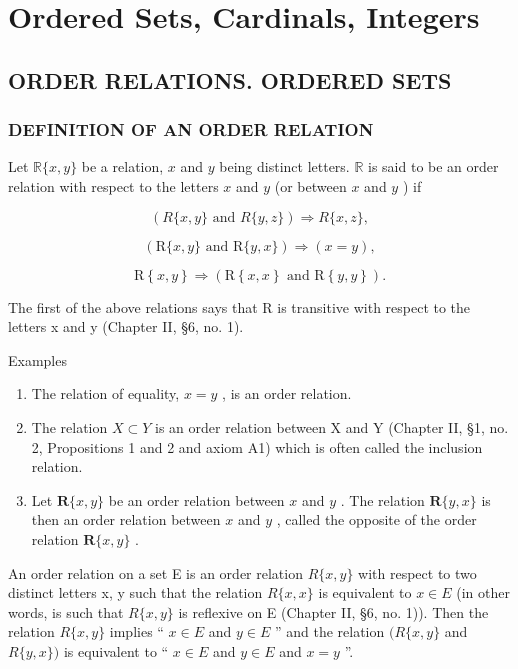 \chapter{Ordered Sets, Cardinals, Integers}

\section{ORDER RELATIONS. ORDERED SETS}

\subsection{DEFINITION OF AN ORDER RELATION}

Let \(\mathbb{R}\{x, y\}\) be a relation, \(x\) and \(y\) being distinct letters. \(\mathbb{R}\) is said to be an order relation with respect to the letters \(x\) and \(y\) (or between \(x\) and \(y\) ) if

\[
(R \{x, y \} \text {   and   } R \{y, z \}) \Longrightarrow R \{x, z \},
\]

\[
(\mathrm{R} \{x, y \} \text {   and   } \mathrm{R} \{y, x \}) \Longrightarrow (x = y),
\]

\[
\mathrm{R} \left\{x, y \right\} \Longrightarrow (\mathrm{R} \left\{x, x \right\} \text { and } \mathrm{R} \left\{y, y \right\}).
\]

The first of the above relations says that R is transitive with respect to the letters x and y (Chapter II, §6, no. 1).

Examples

\begin{enumerate}
\def\labelenumi{(\arabic{enumi})}
\item
  The relation of equality, \(x = y\) , is an order relation.
\item
  The relation \(X \subset Y\) is an order relation between X and Y (Chapter II, §1, no. 2, Propositions 1 and 2 and axiom A1) which is often called the inclusion relation.
\item
  Let \(\mathbf{R}\{x, y\}\) be an order relation between \(x\) and \(y\) . The relation \(\mathbf{R}\{y, x\}\) is then an order relation between \(x\) and \(y\) , called the opposite of the order relation \(\mathbf{R}\{x, y\}\) .
\end{enumerate}

An order relation on a set E is an order relation \(R\{x, y\}\) with respect to two distinct letters x, y such that the relation \(R\{x, x\}\) is equivalent to \(x \in E\) (in other words, is such that \(R\{x, y\}\) is reflexive on E (Chapter II, §6, no. 1)). Then the relation \(R\{x, y\}\) implies `` \(x \in E\) and \(y \in E\) '' and the relation \((R\{x, y\}\) and \(R\{y, x\})\) is equivalent to `` \(x \in E\) and \(y \in E\) and \(x = y\) ''.


